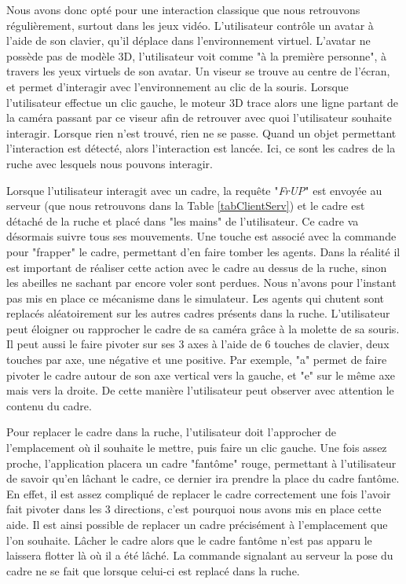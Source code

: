 		Nous avons donc opté pour une interaction classique que nous retrouvons régulièrement, surtout dans les jeux vidéo. L'utilisateur contrôle un avatar à l'aide de son clavier, qu'il déplace dans l'environnement virtuel. L'avatar ne possède pas de modèle 3D, l'utilisateur voit comme "à la première personne", à travers les yeux virtuels de son avatar. Un viseur se trouve au centre de l'écran, et permet d'interagir avec l'environnement au clic de la souris. Lorsque l'utilisateur effectue un clic gauche, le moteur 3D trace alors une ligne partant de la caméra passant par ce viseur afin de retrouver avec quoi l'utilisateur souhaite interagir. Lorsque rien n'est trouvé, rien ne se passe. Quand un objet permettant l'interaction est détecté, alors l'interaction est lancée. Ici, ce sont les cadres de la ruche avec lesquels nous pouvons interagir.
		
		Lorsque l'utilisateur interagit avec un cadre, la requête "\textit{FrUP}" est envoyée au serveur (que nous retrouvons dans la Table \ref{tabClientServ}) et le cadre est détaché de la ruche et placé dans "les mains" de l'utilisateur. Ce cadre va désormais suivre tous ses mouvements. Une touche est associé avec la commande pour "frapper" le cadre, permettant d'en faire tomber les agents. Dans la réalité il est important de réaliser cette action avec le cadre au dessus de la ruche, sinon les abeilles ne sachant par encore voler sont perdues. Nous n'avons pour l'instant pas mis en place ce mécanisme dans le simulateur. Les agents qui chutent sont replacés aléatoirement sur les autres cadres présents dans la ruche.
		L'utilisateur peut éloigner ou rapprocher le cadre de sa caméra grâce à la molette de sa souris. Il peut aussi le faire pivoter sur ses 3 axes à l'aide de 6 touches de clavier, deux touches par axe, une négative et une positive. Par exemple, "a" permet de faire pivoter le cadre autour de son axe vertical vers la gauche, et "e" sur le même axe mais vers la droite. De cette manière l'utilisateur peut observer avec attention le contenu du cadre.
		
		Pour replacer le cadre dans la ruche, l'utilisateur doit l'approcher de l'emplacement où il souhaite le mettre, puis faire un clic gauche. Une fois assez proche, l'application placera un cadre "fantôme" rouge, permettant à l'utilisateur de savoir qu'en lâchant le cadre, ce dernier ira prendre la place du cadre fantôme. En effet, il est assez compliqué de replacer le cadre correctement une fois l'avoir fait pivoter dans les 3 directions, c'est pourquoi nous avons mis en place cette aide. Il est ainsi possible de replacer un cadre précisément à l'emplacement que l'on souhaite. Lâcher le cadre alors que le cadre fantôme n'est pas apparu le laissera flotter là où il a été lâché. La commande signalant au serveur la pose du cadre ne se fait que lorsque celui-ci est replacé dans la ruche.
		
